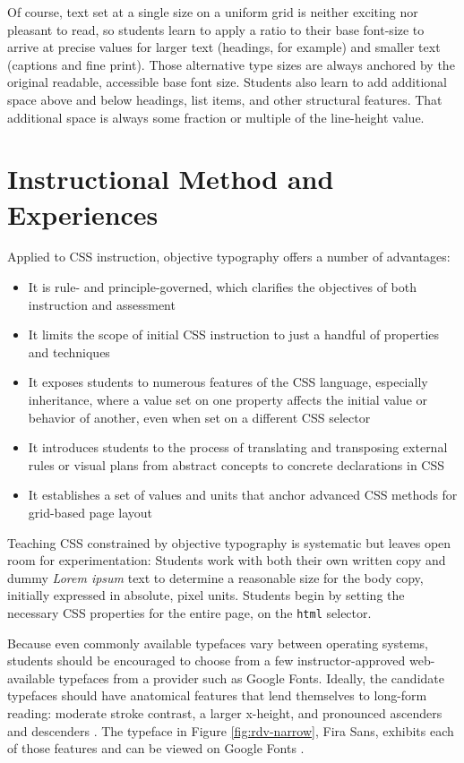 \documentclass[sigplan,screen]{acmart}
\begin{document}
Of course, text set at a single size on a uniform grid is neither exciting nor pleasant to read, so students learn to apply a ratio to their base font-size to arrive at precise values for larger text (headings, for example) and smaller text (captions and fine print). Those alternative type sizes are always anchored by the original readable, accessible base font size. Students also learn to add additional space above and below headings, list items, and other structural features. That additional space is always some fraction or multiple of the line-height value.

\section{Instructional Method and Experiences}

Applied to CSS instruction, objective typography offers a number of advantages:

\begin{itemize}
  \item It is rule- and principle-governed, which clarifies the objectives of both instruction and assessment
  \item It limits the scope of initial CSS instruction to just a handful of properties and techniques
  \item It exposes students to numerous features of the CSS language, especially inheritance, where a value set on one property affects the initial value or behavior of another, even when set on a different CSS selector
  \item It introduces students to the process of translating and transposing external rules or visual plans from abstract concepts to concrete declarations in CSS
  \item It establishes a set of values and units that anchor advanced CSS methods for grid-based page layout
\end{itemize}

Teaching CSS constrained by objective typography is systematic but leaves open room for experimentation: Students work with both their own written copy and dummy {\itshape Lorem ipsum} text to determine a reasonable size for the body copy, initially expressed in absolute, pixel units. Students begin by setting the necessary CSS properties for the entire page, on the \verb|html| selector.

Because even commonly available typefaces vary between operating systems, students should be encouraged to choose from a few instructor-approved web-available typefaces from a provider such as Google Fonts. Ideally, the candidate typefaces should have anatomical features that lend themselves to long-form reading: moderate stroke contrast, a larger x-height, and pronounced ascenders and descenders \cite[p.~36]{jsm:owt}. The typeface in Figure \ref{fig:rdv-narrow}, Fira Sans, exhibits each of those features and can be viewed on Google Fonts \cite{gf:fs}.
\end{document}
